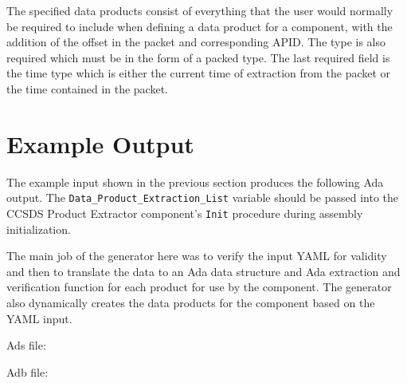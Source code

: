 
The specified data products consist of everything that the user would normally be required to include when defining a data product for a component, with the addition of the offset in the packet and corresponding APID. The type is also required which must be in the form of a packed type. The last required field is the time type which is either the current time of extraction from the packet or the time contained in the packet. 

\section{Example Output}

The example input shown in the previous section produces the following Ada output. The
\texttt{Data\_Product\_Extraction\_List} variable should be passed into the CCSDS Product Extractor component's \texttt{Init} procedure during assembly initialization.

The main job of the generator here was to verify the input YAML for validity and then to translate the data to an Ada data structure and Ada extraction and verification function for each product for use by the component. The generator also dynamically creates the data products for the component based on the YAML input.

Ads file:

Adb file:


